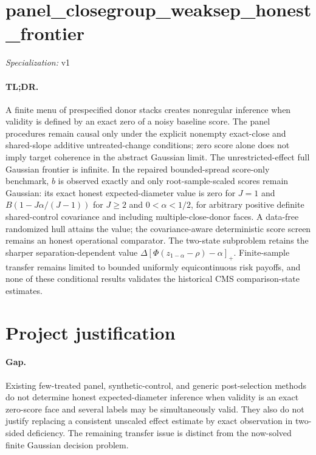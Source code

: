 \documentclass{article}
\begin{document}
\sloppy

\section*{panel\_\allowbreak{}closegroup\_\allowbreak{}weaksep\_\allowbreak{}honest\_\allowbreak{}frontier}

\noindent\textit{Specialization:} v1\par

\paragraph{TL;DR.} A finite menu of prespecified donor stacks creates nonregular inference when validity is defined by an exact zero of a noisy baseline score. The panel procedures remain causal only under the explicit nonempty exact-close and shared-slope additive untreated-change conditions; zero score alone does not imply target coherence in the abstract Gaussian limit. The unrestricted-effect full Gaussian frontier is infinite. In the repaired bounded-spread score-only benchmark, \(b\) is observed exactly and only root-sample-scaled scores remain Gaussian: its exact honest expected-diameter value is zero for \(J=1\) and \(B(1-J\alpha/(J-1))\) for \(J\geq2\) and \(0<\alpha<1/2\), for arbitrary positive definite shared-control covariance and including multiple-close-donor faces. A data-free randomized hull attains the value; the covariance-aware deterministic score screen remains an honest operational comparator. The two-state subproblem retains the sharper separation-dependent value \(\Delta[\Phi(z_{1-\alpha}-\rho)-\alpha]_+\). Finite-sample transfer remains limited to bounded uniformly equicontinuous risk payoffs, and none of these conditional results validates the historical CMS comparison-state estimates.

\section{Project justification}

\paragraph{Gap.} Existing few-treated panel, synthetic-control, and generic post-selection methods do not determine honest expected-diameter inference when validity is an exact zero-score face and several labels may be simultaneously valid. They also do not justify replacing a consistent unscaled effect estimate by exact observation in two-sided deficiency. The remaining transfer issue is distinct from the now-solved finite Gaussian decision problem.
\end{document}
